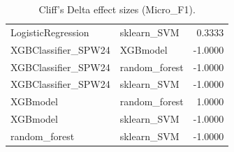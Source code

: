 \begin{table}[t]
\begin{tabular}{llr}
LogisticRegression & sklearn_SVM & 0.3333 \\
XGBClassifier_SPW24 & XGBmodel & -1.0000 \\
XGBClassifier_SPW24 & random_forest & -1.0000 \\
XGBClassifier_SPW24 & sklearn_SVM & -1.0000 \\
XGBmodel & random_forest & 1.0000 \\
XGBmodel & sklearn_SVM & -1.0000 \\
random_forest & sklearn_SVM & -1.0000 \\
\bottomrule
\end{tabular}
\caption{Cliff's Delta effect sizes (Micro_F1).}
\label{tab:cliffs_Micro_F1}
\end{table}